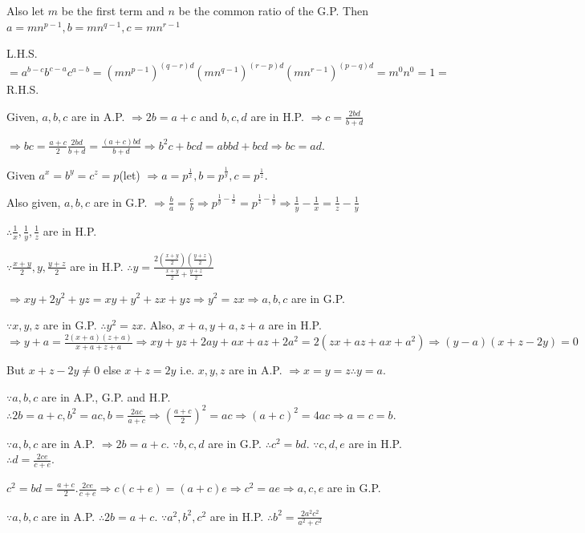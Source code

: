   Also let $m$ be the first term and $n$ be the common ratio of the G.P. Then $a = mn^{p - 1}, b = mn^{q - 1}, c = mn^{r
    -1}$

  L.H.S. $= a^{b - c}b^{c - a}c^{a - b} = (mn^{p - 1})^{(q - r)d}(mn^{q - 1})^{(r - p)d}(mn^{r - 1})^{(p -
    q)d} = m^0n^0 = 1 =$ R.H.S.
\item Given, $a, b, c$ are in A.P. $\Rightarrow 2b = a + c$ and $b, c, d$ are in H.P. $\Rightarrow c =
  \frac{2bd}{b + d}$

  $\Rightarrow bc = \frac{a + c}{2}\frac{2bd}{b + d} = \frac{(a + c)bd}{b + d} \Rightarrow b^2c + bcd = abbd
  + bcd \Rightarrow bc = ad$.
\item Given $a^x = b^y = c^z = p$(let) $\Rightarrow a = p^{\tfrac{1}{x}}, b = p^{\tfrac{1}{y}}, c =
  p^{\frac{1}{z}}$.

  Also given, $a, b, c$ are in G.P. $\Rightarrow \frac{b}{a} = \frac{c}{b} \Rightarrow p^{\tfrac{1}{y} -
    \tfrac{1}{x}} = p^{\tfrac{1}{z} - \tfrac{1}{y}} \Rightarrow \frac{1}{y} - \frac{1}{x} = \frac{1}{z} -
  \frac{1}{y}$

  $\therefore \frac{1}{x}, \frac{1}{y}, \frac{1}{z}$ are in H.P.
\item $\because \frac{x + y}{2}, y, \frac{y + z}{2}$ are in H.P. $\therefore y = \frac{2\left(\tfrac{x +
    y}{2}\right)\left(\tfrac{y + z}{2}\right)}{\tfrac{x + y}{2} + \tfrac{y + z}{2}}$

  $\Rightarrow xy + 2y^2 + yz = xy + y^2 + zx + yz \Rightarrow y^2 = zx \Rightarrow a, b, c$ are in G.P.
\item $\because x, y, z$ are in G.P. $\therefore y^2 = zx$. Also, $x + a, y + a, z + a$ are in
  H.P. $\Rightarrow y + a = \frac{2(x + a)(z + a)}{x + a + z + a} \Rightarrow xy + yz + 2ay + ax + az + 2a^2
  = 2(zx + az + ax + a^2)\Rightarrow (y - a)(x + z - 2y) = 0$

  But $x + z - 2y \neq 0$ else $x + z = 2y$ i.e. $x, y, z$ are in A.P. $\Rightarrow x = y = z \therefore y =
  a$.
\item $\because a, b, c$ are in A.P., G.P. and H.P. $\therefore 2b = a + c, b^2 = ac, b = \frac{2ac}{a + c}
  \Rightarrow \left(\frac{a + c}{2}\right)^2 = ac \Rightarrow (a + c)^2 = 4ac \Rightarrow a = c = b$.
\item $\because a, b, c$ are in A.P. $\Rightarrow 2b = a + c$. $\because b, c, d$ are in G.P. $\therefore
  c^2 = bd$. $\because c, d, e$ are in H.P. $\therefore d = \frac{2ce}{c + e}$.

  $c^2 = bd = \frac{a + c}{2}.\frac{2ce}{c + e} \Rightarrow c(c + e) = (a + c)e \Rightarrow c^2 = ae
  \Rightarrow a, c, e$ are in G.P.
\item $\because a, b, c$ are in A.P. $\therefore 2b = a + c$. $\because a^2, b^2, c^2$ are in
  H.P. $\therefore b^2 = \frac{2a^2c^2}{a^2 + c^2}$

